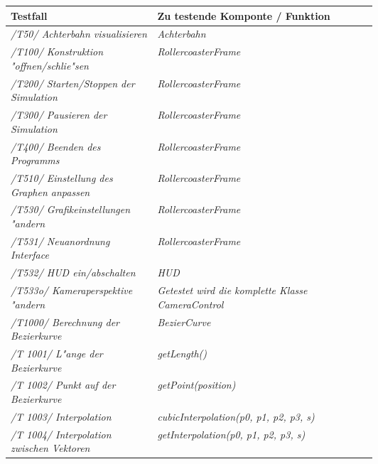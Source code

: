 \begin{longtable}{|p{.3\linewidth}|p{0.6\linewidth}|}
\hline
Testfall & Zu testende Komponte / Funktion \\\hline

\textit{/T50/ Achterbahn visualisieren} & \textit{Achterbahn} \\\hline

\textit{/T100/ Konstruktion "offnen/schlie"sen} & \textit{RollercoasterFrame} \\\hline

\textit{/T200/ Starten/Stoppen der Simulation} & \textit{RollercoasterFrame} \\\hline

\textit{/T300/ Pausieren der Simulation} &  \textit{RollercoasterFrame}\\\hline

\textit{/T400/ Beenden des Programms} & \textit{RollercoasterFrame}\\\hline

\textit{/T510/ Einstellung des Graphen anpassen} &  \textit{RollercoasterFrame}\\\hline

\textit{ /T530/ Grafikeinstellungen "andern} &  \textit{RollercoasterFrame}\\\hline

\textit{/T531/ Neuanordnung Interface} &  \textit{RollercoasterFrame} \\\hline

\textit{/T532/ HUD ein/abschalten} & \textit{HUD}\\\hline

\textit{/T533o/ Kameraperspektive "andern} &  \textit{Getestet wird die komplette Klasse CameraControl}\\\hline

\textit{/T1000/ Berechnung der Bezierkurve}  &  \textit{BezierCurve}\\\hline

\textit{ /T 1001/ L"ange der Bezierkurve} &  \textit{getLength()}\\\hline

\textit{ /T 1002/ Punkt auf der Bezierkurve} &  \textit{getPoint(position)}\\\hline

\textit{ /T 1003/ Interpolation} &  \textit{cubicInterpolation(p0, p1, p2, p3, s)} \\\hline

\textit{ /T 1004/ Interpolation zwischen Vektoren} &  \textit{getInterpolation(p0, p1, p2, p3, s)}\\\hline


\end{longtable}
